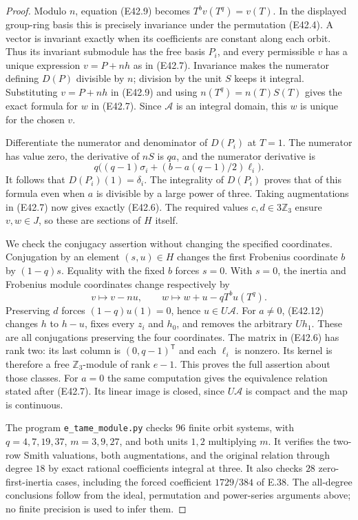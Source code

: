 \begin{proof}
Modulo $n$, equation (E42.9) becomes
$T^bv(T^q)=v(T)$. In the displayed group-ring basis
this is precisely invariance under the permutation
(E42.4). A vector is invariant exactly when its
coefficients are constant along each orbit. Thus
its invariant submodule has the free basis $P_i$,
and every permissible $v$ has a unique expression
$v=P+nh$ as in (E42.7). Invariance makes the
numerator defining $D(P)$ divisible by $n$; division
by the unit $S$ keeps it integral. Substituting
$v=P+nh$ in (E42.9) and using
$n(T^q)=n(T)S(T)$ gives the exact formula for $w$
in (E42.7). Since $\mathscr A$ is an integral domain,
this $w$ is unique for the chosen $v$.

Differentiate the numerator and denominator of
$D(P_i)$ at $T=1$. The numerator has value zero,
the derivative of $nS$ is $qa$, and the numerator
derivative is
\[
 q\bigl((q-1)\sigma_i+
                  (b-a(q-1)/2)\ell_i\bigr).
\]
It follows that $D(P_i)(1)=\delta_i$.
The integrality of $D(P_i)$ proves that of this
formula even when $a$ is divisible by a large
power of three. Taking augmentations in (E42.7)
now gives exactly (E42.6). The required values
$c,d\in3\mathbb Z_3$ ensure $v,w\in J$, so these
are sections of $H$ itself.

We check the conjugacy assertion without changing
the specified coordinates. Conjugation by an element
$(s,u)\in H$ changes the first Frobenius coordinate
$b$ by $(1-q)s$. Equality with the fixed $b$ forces
$s=0$. With $s=0$, the inertia and Frobenius module
coordinates change respectively by
\[
 v\longmapsto v-nu,\qquad
 w\longmapsto w+u-qT^bu(T^q).
 \tag{E42.12}
\]
Preserving $d$ forces $(1-q)u(1)=0$, hence
$u\in U\mathscr A$. For $a\ne0$, (E42.12)
changes $h$ to $h-u$, fixes every $z_i$ and $h_0$,
and removes the arbitrary $Uh_1$. These are all
conjugations preserving the four coordinates.
The matrix in (E42.6) has rank two: its last column
is $(0,q-1)^{\mathsf T}$ and each $\ell_i$ is
nonzero. Its kernel is therefore a free
$\mathbb Z_3$-module of rank $e-1$. This proves
the full assertion about those classes. For $a=0$
the same computation gives the equivalence relation
stated after (E42.7). Its linear image is closed,
since $U\mathscr A$ is compact and the map is
continuous.

The program \texttt{e\_tame\_module.py} checks
$96$ finite orbit systems, with $q=4,7,19,37$,
$m=3,9,27$, and both units $1,2$ multiplying $m$.
It verifies the two-row Smith valuations, both
augmentations, and the original relation through
degree $18$ by exact rational coefficients integral
at three. It also checks $28$ zero-first-inertia
cases, including the forced coefficient $1729/384$
of E.38. The all-degree conclusions follow from
the ideal, permutation and power-series arguments
above; no finite precision is used to infer them.
\end{proof}


